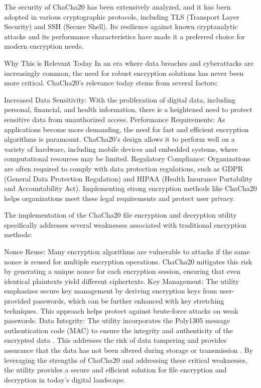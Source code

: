 \documentclass[a4paper,12pt]{report}
\begin{document}
The security of ChaCha20 has been extensively analyzed, and it has been adopted in various cryptographic protocols, including TLS (Transport Layer Security) and SSH (Secure Shell).
Its resilience against known cryptanalytic attacks and its performance characteristics have made it a preferred choice for modern encryption needs.

Why This is Relevant Today
In an era where data breaches and cyberattacks are increasingly common, the need for robust encryption solutions has never been more critical.
ChaCha20's relevance today stems from several factors:

Increased Data Sensitivity: With the proliferation of digital data, including personal, financial, and health information, there is a heightened need to protect sensitive data from unauthorized access.
Performance Requirements: As applications become more demanding, the need for fast and efficient encryption algorithms is paramount.
ChaCha20's design allows it to perform well on a variety of hardware, including mobile devices and embedded systems, where computational resources may be limited.
Regulatory Compliance: Organizations are often required to comply with data protection regulations, such as GDPR (General Data Protection Regulation) and HIPAA (Health Insurance Portability and Accountability Act).
Implementing strong encryption methods like ChaCha20 helps organizations meet these legal requirements and protect user privacy.

The implementation of the ChaCha20 file encryption and decryption utility specifically addresses several weaknesses associated with traditional encryption methods:

Nonce Reuse: Many encryption algorithms are vulnerable to attacks if the same nonce is reused for multiple encryption operations.
ChaCha20 mitigates this risk by generating a unique nonce for each encryption session, ensuring that even identical plaintexts yield different ciphertexts.
Key Management: The utility emphasizes secure key management by deriving encryption keys from user-provided passwords, which can be further enhanced with key stretching techniques.
This approach helps protect against brute-force attacks on weak passwords.
Data Integrity: The utility incorporates the Poly1305 message authentication code (MAC) to ensure the integrity and authenticity of the encrypted data \cite{de2017chacha20}.
This addresses the risk of data tampering and provides assurance that the data has not been altered during storage or transmission \cite{degabriele2021security}.
By leveraging the strengths of ChaCha20 and addressing these critical weaknesses, the utility provides a secure and efficient solution for file encryption and decryption in today's digital landscape.
\end{document}
